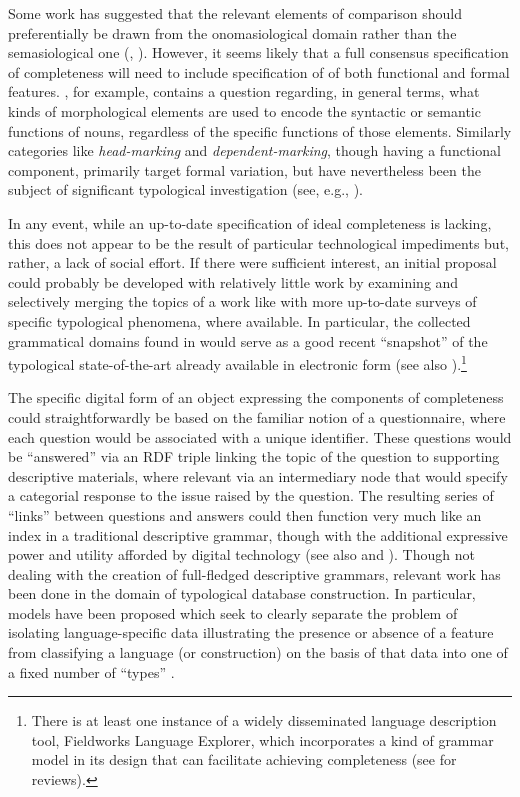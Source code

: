 \documentclass[12pt]{article}
\newcommand\namecite{\citet}
\newcommand\citeboth{\citealt}
\renewcommand\cite{\citep}
\begin{document}
Some work has suggested that the relevant elements of comparison should
preferentially be drawn from the onomasiological domain rather than the
semasiological one (\citeboth[122]{Zaefferer:2006},
\citeboth[140--142]{Cristofaro:2006}). However, it seems likely that a full
consensus specification of completeness will need to include specification of of
both functional and formal features. \namecite[28]{ComrieSmith:1977}, for
example, contains a question regarding, in general terms, what kinds of
morphological elements are used to encode the syntactic or semantic functions of
nouns, regardless of the specific functions of those elements. Similarly
categories like \emph{head-marking} and \emph{dependent-marking}, though having
a functional component, primarily target formal variation, but have nevertheless
been the subject of significant typological investigation (see, e.g.,
\namecite{Nichols:1992}).

In any event, while an up-to-date specification of ideal completeness is
lacking, this does not appear to be the result of particular technological
impediments but, rather, a lack of social effort. If there were sufficient
interest, an initial proposal could probably be developed with relatively little
work by examining and selectively merging the topics of a work like
\namecite{ComrieSmith:1977} with more up-to-date surveys of specific typological
phenomena, where available. In particular, the collected grammatical domains
found in \namecite{WALS:2011} would serve as a good recent ``snapshot'' of the
typological state-of-the-art already available in electronic form (see also
\namecite[262--266]{LevinEtAl:2007}).{\footnote{There is at least one instance
of a widely disseminated language description tool, Fieldworks Language
Explorer, which incorporates a kind of grammar model in its design that can
facilitate achieving completeness (see
\namecite{ButlerVolkinburg:2007,Rogers:2010} for reviews).}}

The specific digital form of an object expressing the components of 
completeness could straightforwardly be based on the familiar notion of a
questionnaire, where each question would be associated with a unique identifier.
These questions would be ``answered'' via an RDF triple linking the topic of the
question to supporting descriptive materials, where relevant via an intermediary
node that would specify a categorial response to the issue raised by the
question. The resulting series of ``links'' between questions and answers could
then function very much like an index in a traditional descriptive grammar,
though with the additional expressive power and utility afforded by digital
technology (see also \namecite[115]{Zaefferer:2006} and
\namecite[162]{Cristofaro:2006}). Though not dealing with the creation of
full-fledged descriptive grammars, relevant work has been done in the domain of
typological database construction. In particular, models have been proposed
which seek to clearly separate the problem of isolating language-specific data
illustrating the presence or absence of a feature from classifying a language
(or construction) on the basis of that data into one of a fixed number of
``types'' \cite{BickelNichols:2002,Cysouw:2007:Social}.
\end{document}
